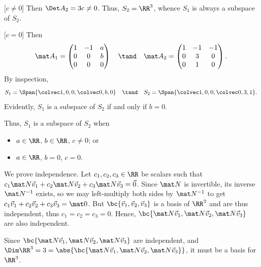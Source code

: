 \begin{solution}
    \begin{ppart}
        [$c \neq 0$] Then $\Det A_2 = 3c \neq 0$. Thus, $S_2 = \RR^3$, whence $S_1$ is always a subspace of $S_2$.

        [$c = 0$] Then \[\mat A_1 = \begin{pmatrix}1 & -1 & a \\ 0 & 0 & b \\ 0 & 0 & 0\end{pmatrix} \quad \tand \quad \mat A_2 = \begin{pmatrix}1 & -1 & -1 \\ 0 & 3 & 0 \\ 0 & 1 & 0\end{pmatrix}.\] By inspection, \[S_1 = \Span{\cveciii100, \cveciii0b0} \quad \tand \quad S_2 = \Span{\cveciii100, \cveciii031}.\] Evidently, $S_1$ is a subspace of $S_2$ if and only if $b = 0$.

        Thus, $S_1$ is a subspace of $S_2$ when
        \begin{itemize}
            \item $a \in \RR$, $b \in \RR$, $c \neq 0$; or
            \item $a \in \RR$, $b = 0$, $c = 0$.
        \end{itemize}
    \end{ppart}
    \begin{ppart}
        We prove independence. Let $c_1, c_2, c_3 \in \RR$ be scalars such that $c_1 \mat N \vec v_1 + c_2 \mat N \vec v_2 + c_3 \mat N \vec v_3 = \vec 0$. Since $\mat N$ is invertible, its inverse $\mat N^{-1}$ exists, so we may left-multiply both sides by $\mat N^{-1}$ to get $c_1 \vec v_1 + c_2 \vec v_2 + c_3 \vec v_3 = \mat 0$. But $\bc{\vec v_1, \vec v_2, \vec v_3}$ is a basis of $\RR^3$ and are thus independent, thus $c_1 = c_2 = c_3 = 0$. Hence, $\bc{\mat N \vec v_1, \mat N \vec v_2, \mat N \vec v_3}$ are also independent.

        Since $\bc{\mat N \vec v_1, \mat N \vec v_2, \mat N \vec v_3}$ are independent, and $\Dim \RR^3 = 3 = \abs{\bc{\mat N \vec v_1, \mat N \vec v_2, \mat N \vec v_3}}$, it must be a basis for $\RR^3$.
    \end{ppart}
\end{solution}

